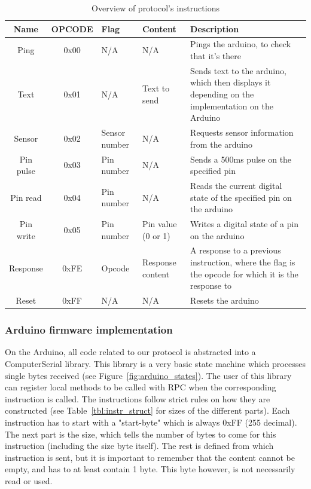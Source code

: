 \begin{table}[h!]
	\begin{tabular}{ | c | c | p{1.5cm} | p{1.7cm} | p{6cm} |}
		\hline
		\textbf{Name} & \textbf{OPCODE} & \textbf{Flag} & \textbf{Content} & \textbf{Description} \\
		\hline
		Ping & 0x00 & N/A & N/A & Pings the arduino, to check that it's there \\
		\hline
		Text & 0x01 & N/A & Text to send & Sends text to the arduino, which then displays it depending on the implementation on the Arduino \\
		\hline
		Sensor & 0x02 & Sensor number & N/A & Requests sensor information from the arduino \\
		\hline
		Pin pulse & 0x03 & Pin number & N/A & Sends a 500ms pulse on the specified pin \\
		\hline
		Pin read & 0x04 & Pin number & N/A & Reads the current digital state of the specified pin on the arduino \\
		\hline
		Pin write & 0x05 & Pin number & Pin value (0 or 1) & Writes a digital state of a pin on the arduino \\
		\hline
		Response & 0xFE & Opcode & Response content & A response to a previous instruction, where the flag is the opcode for which it is the response to \\
		\hline
		Reset & 0xFF & N/A & N/A & Resets the arduino \\
		\hline
	\end{tabular}
	\caption{Overview of protocol's instructions}
	\label{tbl:opcodes}
\end{table}

\subsubsection{Arduino firmware implementation}
On the Arduino, all code related to our protocol is abstracted into a ComputerSerial library.
This library is a very basic state machine which processes single bytes received (see Figure~\ref{fig:arduino_states}).
The user of this library can register local methods to be called with RPC when the corresponding instruction is called.
The instructions follow strict rules on how they are constructed (see Table~\ref{tbl:instr_struct} for sizes of the different parts).
Each instruction has to start with a "start-byte" which is always 0xFF (255 decimal). The next part is the size, which tells the number of bytes to come for this instruction (including the size byte itself). The rest is defined from which instruction is sent, but it is important to
remember that the content cannot be empty, and has to at least contain 1 byte. This byte however, is not necessarily read or used.


